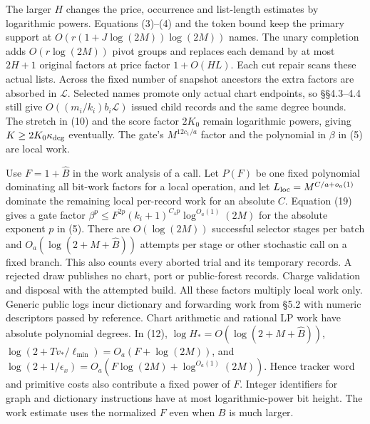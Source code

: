 \documentclass[11pt]{article}
\begin{document}
The larger \(H\) changes the price, occurrence and list-length estimates by logarithmic powers. Equations (3)--(4) and the token bound keep the primary support at \(O(r(1+J\log(2M))\log(2M))\) names. The unary completion adds \(O(r\log(2M))\) pivot groups and replaces each demand by at most \(2H+1\) original factors at price factor \(1+O(HL)\). Each cut repair scans these actual lists. Across the fixed number of snapshot ancestors the extra factors are absorbed in \(\mathcal L\). Selected names promote only actual chart endpoints, so §§4.3--4.4 still give \(O((m_i/k_i)b_i\mathcal L)\) issued child records and the same degree bounds. The stretch in (10) and the score factor \(2K_0\) remain logarithmic powers, giving \(K\ge2K_0\kappa_{\rm deg}\) eventually. The gate's \(M^{12c_1/a}\) factor and the polynomial in \(\beta\) in (5) are local work.

Use \(F=1+\widehat B\) in the work analysis of a call. Let \(P(F)\) be one fixed polynomial dominating all bit-work factors for a local operation, and let \(L_{\rm loc}=M^{C/a+o_a(1)}\) dominate the remaining local per-record work for an absolute \(C\). Equation (19) gives a gate factor \(\beta^{p}\le F^{2p}(k_i+1)^{C_4p}\log^{O_a(1)}(2M)\) for the absolute exponent \(p\) in (5). There are \(O(\log(2M))\) successful selector stages per batch and \(O_a(\log(2+M+\widehat B))\) attempts per stage or other stochastic call on a fixed branch. This also counts every aborted trial and its temporary records. A rejected draw publishes no chart, port or public-forest records. Charge validation and disposal with the attempted build. All these factors multiply local work only. Generic public logs incur dictionary and forwarding work from §5.2 with numeric descriptors passed by reference. Chart arithmetic and rational LP work have absolute polynomial degrees. In (12), \(\log H_\ast=O(\log(2+M+\widehat B))\), \(\log(2+Tv_\ast/\ell_{\min})=O_a(F+\log(2M))\), and \(\log(2+1/\epsilon_x)=O_a(F\log(2M)+\log^{O_a(1)}(2M))\). Hence tracker word and primitive costs also contribute a fixed power of \(F\). Integer identifiers for graph and dictionary instructions have at most logarithmic-power bit height. The work estimate uses the normalized \(F\) even when \(B\) is much larger.
\end{document}
